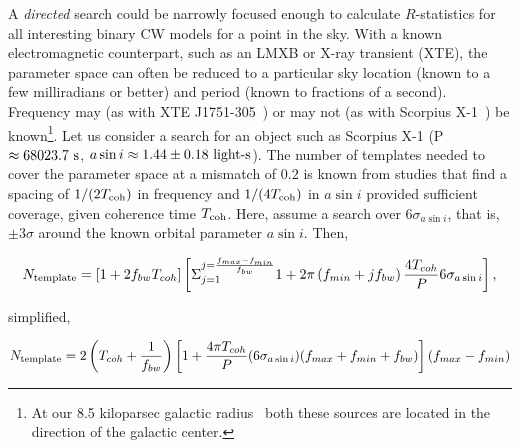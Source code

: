 A \textit{directed} search could be narrowly focused enough to calculate $R$-statistics for all interesting binary CW models for a point in the sky.
With a known electromagnetic counterpart, such as an LMXB or X-ray transient (XTE), the parameter space can often be reduced to a particular sky location (known to a few milliradians or better) and period (known to fractions of a second).
Frequency may (as with XTE J1751-305~\cite{Markwardt2002}) or may not (as with Scorpius X-1~\cite{Galloway2014}) be known\footnote{At our 8.5 kiloparsec galactic radius~\cite{KerrLyndenBell1986} both these sources are located in the direction of the galactic center.}.
Let us consider a search for an object such  as Scorpius X-1 (P $\approx 68023.7 \textup{ s}$, $a \sin i \approx 1.44\pm0.18 \textup{ light-s}$). The number of templates needed to cover the parameter space at a mismatch of $0.2$ is known from studies that find a spacing of $1/(2 T_\textup{coh})$ in frequency and $1/(4 T_\textup{coh})$ in $a \sin i$ provided sufficient coverage, given coherence time $T_\textup{coh}$. 
Here, assume a search over $6\sigma_{a \sin i}$, that is, $\pm 3 \sigma$ around the known orbital parameter $a\sin i$. 
Then,

\begin{equation}
N_{\textup{{template}}}=\left[1+2f_{bw}T_{coh}\right] \left[ {\displaystyle \Sigma}_{j=1}^{j = \frac{f_{max} - f_{min}}{f_{bw}}} 1 + 2\pi\left(f_{min} + j f_{bw}\right) \frac{4 T_{coh}}{P} 6 \sigma_{a \sin i} \right],
\label{N_template_full}
\end{equation}

\noindent simplified,

\begin{equation}
N_{\textup{template}} = 2 \left(T_{coh} + \frac{1}{f_{bw}}\right)\left[ 1+\frac{4 \pi T_{coh}}{P} (6\sigma_{a \sin i})(f_{max} + f_{min} + f_{bw})\right] (f_{max} - f_{min})
\label{N_template_simple}
\end{equation}

